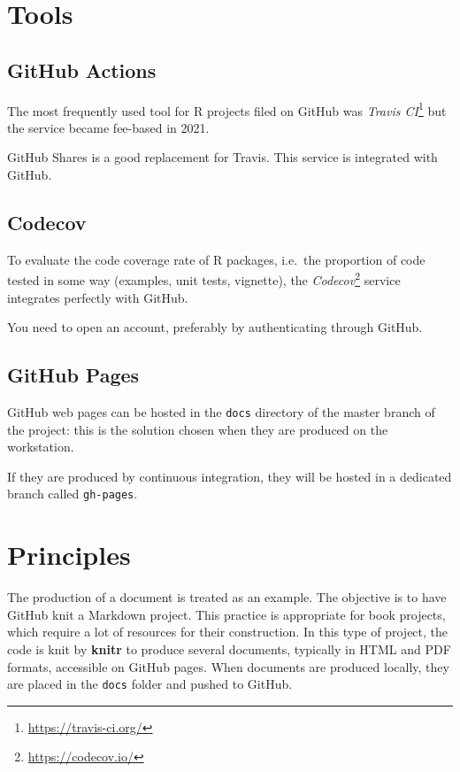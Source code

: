 \documentclass[
  12pt,
  american,
  a4paper,
  extrafontsizes,onecolumn,openright
  ]{memoir}
\newlength{\rf}
\begin{document}
\hypertarget{tools}{%
\section{Tools}\label{tools}}

\hypertarget{github-actions}{%
\subsection{GitHub Actions}\label{github-actions}}

The most frequently used tool for R projects filed on GitHub was \emph{Travis CI}\footnote{\url{https://travis-ci.org/}} but the service became fee-based in 2021.

GitHub Shares is a good replacement for Travis.
This service is integrated with GitHub.

\hypertarget{codecov}{%
\subsection{Codecov}\label{codecov}}

To evaluate the code coverage rate of R packages, i.e.~the proportion of code tested in some way (examples, unit tests, vignette), the \emph{Codecov}\footnote{\url{https://codecov.io/}} service integrates perfectly with GitHub.

You need to open an account, preferably by authenticating through GitHub.

\hypertarget{github-pages}{%
\subsection{GitHub Pages}\label{github-pages}}

GitHub web pages can be hosted in the \texttt{docs} directory of the master branch of the project: this is the solution chosen when they are produced on the workstation.

If they are produced by continuous integration, they will be hosted in a dedicated branch called \texttt{gh-pages}.

\hypertarget{principles}{%
\section{Principles}\label{principles}}

The production of a document is treated as an example.
The objective is to have GitHub knit a Markdown project.
This practice is appropriate for book projects, which require a lot of resources for their construction.
In this type of project, the code is knit by \textbf{knitr} to produce several documents, typically in HTML and PDF formats, accessible on GitHub pages.
When documents are produced locally, they are placed in the \texttt{docs} folder and pushed to GitHub.
\end{document}
